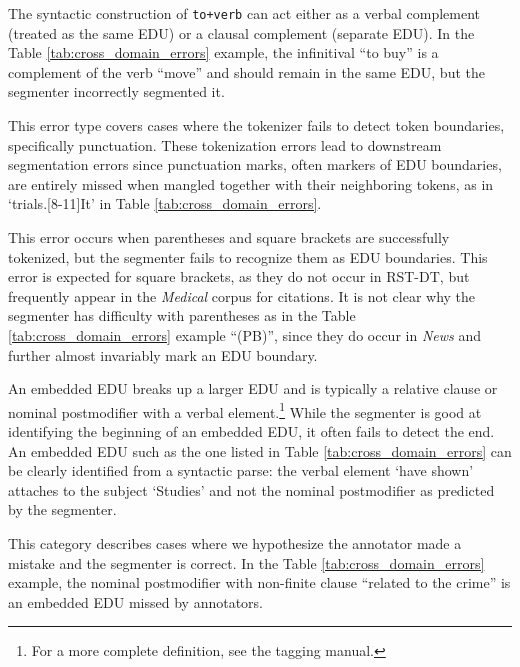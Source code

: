  The syntactic construction of \texttt{to+verb} can act either as a verbal complement (treated as the same EDU) or a clausal complement (separate EDU). In the Table \ref{tab:cross_domain_errors} example, the infinitival ``to buy'' is a complement of the verb ``move'' and should remain in the same EDU, but the segmenter incorrectly segmented it.

 This error type covers cases where the tokenizer fails to detect token boundaries, specifically punctuation. These tokenization errors lead to downstream segmentation errors since punctuation marks, often markers of EDU boundaries, are entirely missed when mangled together with their neighboring tokens, as in `trials.[8-11]It' in Table \ref{tab:cross_domain_errors}. 

 This error occurs when parentheses and square brackets are successfully tokenized, but the segmenter fails to recognize them as EDU boundaries. This error is expected for square brackets, as they do not occur in RST-DT, but frequently appear in the \textit{Medical} corpus for citations. It is not clear why the segmenter has difficulty with parentheses as in the Table \ref{tab:cross_domain_errors} example ``(PB)'', since they do occur in \textit{News} and further almost invariably mark an EDU boundary. 

 An embedded EDU breaks up a larger EDU and is typically a relative clause or nominal postmodifier with a verbal element.\footnote{For a more complete definition, see the tagging manual.} While the segmenter is good at identifying the beginning of an embedded EDU, it often fails to detect the end. An embedded EDU such as the one listed in Table \ref{tab:cross_domain_errors} can be clearly identified from a syntactic parse: the verbal element `have shown' attaches to the subject `Studies' and not the nominal postmodifier as predicted by the segmenter.

 This category describes cases where we hypothesize the annotator made a mistake and the segmenter is correct. In the Table \ref{tab:cross_domain_errors} example, the nominal postmodifier with non-finite clause ``related to the crime'' is an embedded EDU missed by annotators.


